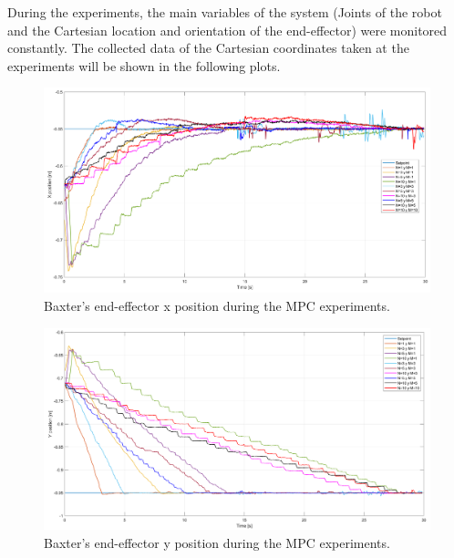 \documentclass[11pt]{report} %
\begin{document}
During the experiments, the main variables of the system (Joints of the robot and the Cartesian location and orientation of the end-effector) were monitored constantly. The collected data of the Cartesian coordinates taken at the experiments will be shown in the following plots.\\

\begin{figure}[H]
    \centering
    \includegraphics[width=1.0\linewidth]{assets/imgs/control_theory/mpc_tests/x_pose.png}
    \caption{Baxter's end-effector x position during the MPC experiments.} 
    \label{fig_baxter_x_pose_mpc_experiments}
\end{figure}

\begin{figure}[H]
    \centering
    \includegraphics[width=1.0\linewidth]{assets/imgs/control_theory/mpc_tests/y_pose.png}
    \caption{Baxter's end-effector y position during the MPC experiments.} 
    \label{fig_baxter_y_pose_mpc_experiments}
\end{figure}
\end{document}
